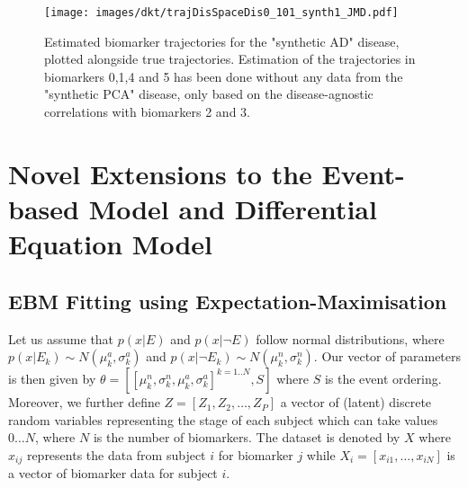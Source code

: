 


\begin{figure}
\texttt{[image: images/dkt/trajDisSpaceDis0\_101\_synth1\_JMD.pdf]}
 \caption[Estimated biomarker trajectories for the "synthetic AD" disease, plotted alongside true trajectories.]{Estimated biomarker trajectories for the "synthetic AD" disease, plotted alongside true trajectories. Estimation of the trajectories in biomarkers 0,1,4 and 5 has been done without any data from the "synthetic PCA" disease, only based on the disease-agnostic correlations with biomarkers 2 and 3.}
 \label{fig:dktSynthTrajADSpace}
\end{figure}

\chapter[Novel Extensions to the EBM and DEM]{Novel Extensions to the Event-based Model and Differential Equation Model}

\section{EBM Fitting using Expectation-Maximisation}
\label{sec:appEbmEm}

Let us assume that $p(x|E)$ and $p(x|\neg E)$ follow normal distributions, where $p(x|E_k) \sim N(\mu^a_k, \sigma^a_k)$ and $p(x|\neg E_k) \sim N(\mu^n_k, \sigma^n_k)$. Our vector of parameters is then given by $\theta = [[\mu_k^n, \sigma_k^n, \mu_k^a, \sigma_k^a]^{k=1..N}, S ]$ where $S$ is the event ordering. Moreover, we further define $Z = [Z_1, Z_2, \dots, Z_P]$ a vector of (latent) discrete random variables representing the stage of each subject which can take values $0 \dots N$, where $N$ is the number of biomarkers. The dataset is denoted by $X$ where $x_{ij}$ represents the data from subject $i$ for biomarker $j$ while $X_i = [x_{i1}, \dots, x_{iN}]$ is a vector of biomarker data for subject $i$. 

